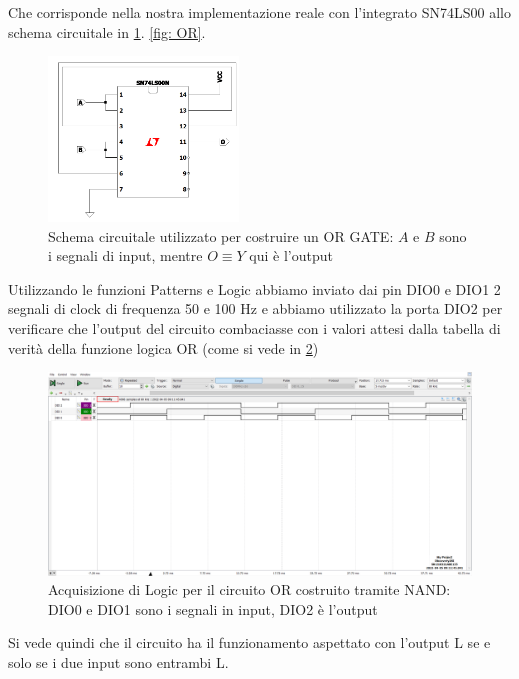 \documentclass[10pt, a4paper, italian]{article}
\begin{document}
Che corrisponde nella nostra implementazione reale con l'integrato SN74LS00
allo schema circuitale in \cref{fig: OR_circ}.
\cref{fig: OR}.
\begin{figure}[htbp]
    \centering
    \includegraphics[width=0.45\textwidth]{NAND_OR}
    \caption{Schema circuitale utilizzato per costruire un
    OR GATE: $A$ e $B$ sono i segnali di input, mentre $O \equiv Y$ qui è
    l'output \label{fig: OR_circ}}
\end{figure}

Utilizzando le funzioni Patterns e Logic abbiamo inviato dai pin DIO0 e DIO1
2 segnali di clock di frequenza 50 e 100 Hz e abbiamo utilizzato la porta
DIO2 per verificare che l'output del circuito combaciasse con i valori attesi
dalla tabella di verità della funzione logica OR (come si vede in
\cref{fig: or_time})
\begin{figure}[htbp]
    \centering
    \includegraphics[width=\textwidth]{or_time}
    \caption{Acquisizione di Logic per il circuito OR costruito tramite NAND: DIO0 e DIO1 sono i segnali in input, DIO2 è l'output\label{fig: or_time}}
\end{figure}
Si vede quindi che il circuito ha il funzionamento aspettato con l'output L se e solo se i due input sono entrambi L.
\end{document}
